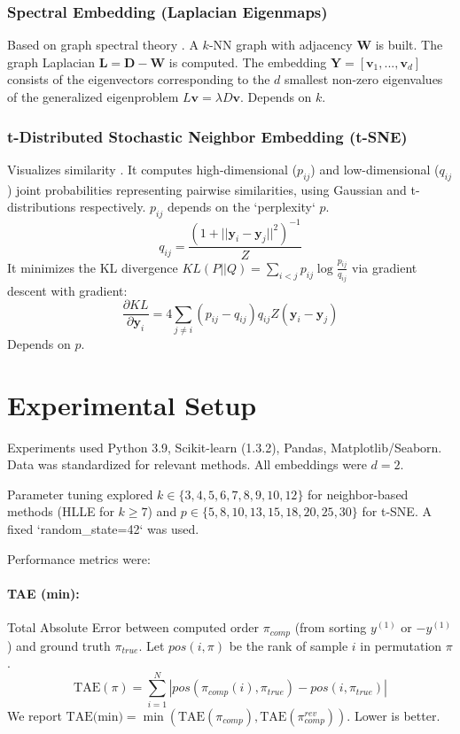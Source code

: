 \documentclass{article}
\begin{document}
\subsubsection{Spectral Embedding (Laplacian Eigenmaps)}
Based on graph spectral theory \citep{Belkin2003}. A $k$-NN graph with adjacency $\mathbf{W}$ is built. The graph Laplacian $\mathbf{L} = \mathbf{D} - \mathbf{W}$ is computed. The embedding $\mathbf{Y} = [\mathbf{v}_1, ..., \mathbf{v}_d]$ consists of the eigenvectors corresponding to the $d$ smallest non-zero eigenvalues of the generalized eigenproblem $L\mathbf{v} = \lambda D\mathbf{v}$. Depends on $k$.

\subsubsection{t-Distributed Stochastic Neighbor Embedding (t-SNE)}
Visualizes similarity \citep{vanDerMaaten2008}. It computes high-dimensional ($p_{ij}$) and low-dimensional ($q_{ij}$) joint probabilities representing pairwise similarities, using Gaussian and t-distributions respectively. $p_{ij}$ depends on the `perplexity` $p$.
\[ q_{ij} = \frac{(1 + ||\mathbf{y}_i - \mathbf{y}_j||^2)^{-1}}{Z} \]
It minimizes the KL divergence $KL(P||Q) = \sum_{i<j} p_{ij} \log \frac{p_{ij}}{q_{ij}}$ via gradient descent with gradient:
\[ \frac{\partial KL}{\partial \mathbf{y}_i} = 4 \sum_{j \neq i} (p_{ij} - q_{ij}) q_{ij} Z (\mathbf{y}_i - \mathbf{y}_j) \]
Depends on $p$.

\section{Experimental Setup}
\label{sec:setup}

Experiments used Python 3.9, Scikit-learn (1.3.2), Pandas, Matplotlib/Seaborn. Data was standardized for relevant methods. All embeddings were $d=2$.

Parameter tuning explored $k \in \{3, 4, 5, 6, 7, 8, 9, 10, 12\}$ for neighbor-based methods (HLLE for $k \ge 7$) and $p \in \{5, 8, 10, 13, 15, 18, 20, 25, 30\}$ for t-SNE. A fixed `random\_state=42` was used.

Performance metrics were:
\paragraph{TAE (min):} Total Absolute Error between computed order $\pi_{comp}$ (from sorting $y^{(1)}$ or $-y^{(1)}$) and ground truth $\pi_{true}$. Let $pos(i, \pi)$ be the rank of sample $i$ in permutation $\pi$.
\[ \text{TAE}(\pi) = \sum_{i=1}^N |pos(\pi_{comp}(i), \pi_{true}) - pos(i, \pi_{true})| \]
We report $\text{TAE(min)} = \min(\text{TAE}(\pi_{comp}), \text{TAE}(\pi_{comp}^{rev}))$. Lower is better.
\end{document}
